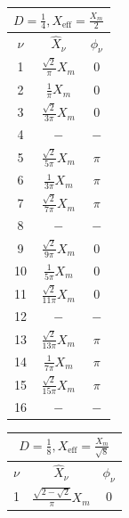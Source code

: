 \documentclass[a4paper, 12pt]{article}
\begin{document}
\begin{center}
\begin{tabular}{@{}ccc@{}}
        \toprule
        \multicolumn{3}{c}{$D = \frac{1}{4}, X_{\text{eff}}=\frac{X_m}{2}$} \\ \midrule
        $\nu$      & $\hat{X}_\nu$   & $\phi_\nu$ \\ \hline
        1          &  $\frac{\sqrt{2}}{\pi} X_m$      &      $0$        \\
        2          &  $\frac{1}{\pi} X_m$         &       $0$        \\
        3          &  $\frac{\sqrt{2}}{3\pi} X_m$         &   $0$           \\
        4          &  $-$         &       $-$        \\
        5          &  $\frac{\sqrt{2}}{5\pi} X_m$      &       $\pi$      \\
        6          &  $\frac{1}{3\pi} X_m$         &       $\pi$      \\
        7          &  $\frac{\sqrt{2}}{7\pi} X_m$         &          $\pi$   \\
        8          &  $-$         &       $-$       \\
        9          &  $\frac{\sqrt{2}}{9\pi} X_m$         &       $0$      \\
        10         &  $\frac{1}{5\pi} X_m$         &       $0$       \\
        11         &  $\frac{\sqrt{2}}{11\pi} X_m$         &       $0$      \\
        12         &  $-$         &       $-$       \\
        13         &  $\frac{\sqrt{2}}{13 \pi} X_m$         &      $\pi$       \\
        14         &  $\frac{1}{7\pi} X_m$         &      $\pi$        \\
        15         &  $\frac{\sqrt{2}}{15\pi} X_m$         &      $\pi$       \\
        16         &  $-$         &       $-$       \\ \bottomrule
        \end{tabular}
        \hspace{0.6180339887498948cm}
        \begin{tabular}{@{}ccc@{}}
        \toprule
        \multicolumn{3}{c}{$D = \frac{1}{8}, X_{\text{eff}}=\frac{X_m}{\sqrt{8}}$} \\ \midrule
        $\nu$      & $\hat{X}_\nu$   & $\phi_\nu$ \\ \hline
        1          &  $\frac{\sqrt{2-\sqrt{2}}}{\pi} X_m$      &      $0$        \\

\end{tabular}
\end{center}
\end{document}
